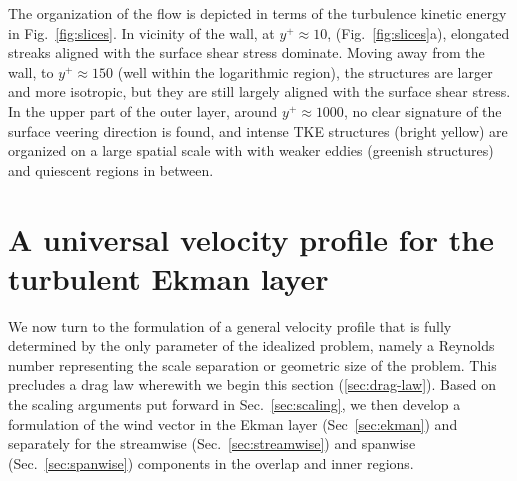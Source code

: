 \documentclass[a4paper,11pt]{amsart}
\begin{document}
The organization of the flow is depicted in terms of the turbulence kinetic energy in Fig.~\ref{fig:slices}.
%
In vicinity of the wall, at $y^+\approx 10$, (Fig.~\ref{fig:slices}a), elongated streaks aligned with the
surface shear stress dominate.
%
Moving away from the wall, to $y^+\approx 150$ (well within the logarithmic region), the structures
are larger and more isotropic, but they are still largely aligned with the surface shear stress.
%
In the upper part of the outer layer, around $y^+\approx 1000$, no clear signature of the
surface veering direction is found, and intense TKE structures (bright yellow)
are organized on a large spatial scale with with weaker eddies (greenish structures) and quiescent regions
in between.  

\section{A universal velocity profile for the turbulent Ekman layer}
\label{sec:profiles} 
%
We now turn to the formulation of a general velocity profile that is fully determined by the only
parameter of the idealized problem, namely a Reynolds number representing the scale separation or
geometric size of the problem.
%
This precludes a drag law wherewith we begin this section (\ref{sec:drag-law}).
Based on the scaling arguments put forward in Sec.~\ref{sec:scaling}, we then develop
a formulation of the wind vector in the Ekman layer (Sec~\ref{sec:ekman}) and separately
for the streamwise (Sec.~\ref{sec:streamwise}) and spanwise (Sec.~\ref{sec:spanwise}) components
in the overlap and inner regions. 
%
% 
\end{document}
